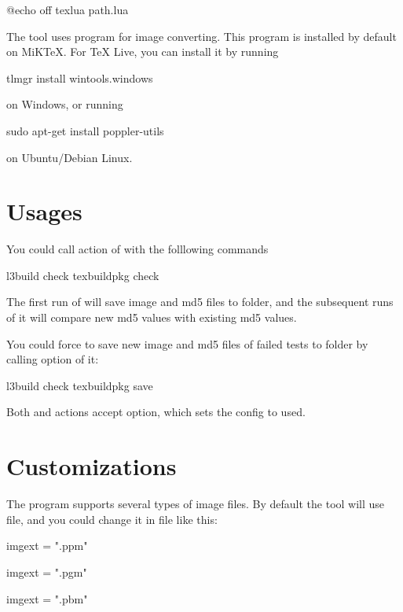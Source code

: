 \documentclass[oneside,12pt]{article}
\begin{document}
\begin{codehigh}
@echo off
texlua path\to\texbuildpkg.lua %
\end{codehigh}

The  tool uses  program for image converting.
This program is installed by default on MiKTeX. For TeX Live, you can install it by running
\begin{codehigh}
tlmgr install wintools.windows
\end{codehigh}
on Windows, or running
\begin{codehigh}
sudo apt-get install poppler-utils
\end{codehigh}
on Ubuntu/Debian Linux.

\section{Usages}

You could call  action of  with the folllowing commands
\begin{codehigh}
l3build check
texbuildpkg check
\end{codehigh}

The first run of  will save image and md5 files to  folder,
and the subsequent runs of it will compare new md5 values with existing md5 values.

You could force  to save new image and md5 files of failed tests to
 folder by calling  option of it:
\begin{codehigh}
l3build check
texbuildpkg save
\end{codehigh}

Both  and  actions accept  option, which sets the config to used.

\section{Customizations}

The  program supports several types of image files.
By default the  tool will use  file,
and you could change it in  file like this:
\begin{codehigh}
imgext = ".ppm"
\end{codehigh}
\begin{codehigh}
imgext = ".pgm"
\end{codehigh}
\begin{codehigh}
imgext = ".pbm"
\end{codehigh}
\end{document}
